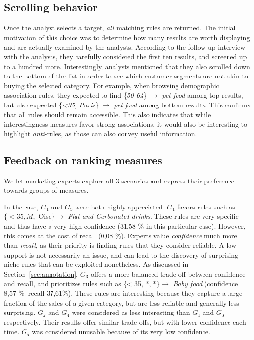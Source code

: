 \subsection{Scrolling behavior}
Once the analyst selects a target, \emph{all} matching rules are returned.
The initial motivation of this choice was to determine how many results
are worth displaying and are actually examined by the analysts.
According to the follow-up interview with the analysts, they carefully considered the first ten results,
and screened up to a hundred more.
Interestingly, analysts mentioned that
they also scrolled down to the bottom of the list
in order to see which customer segments are not akin to buying the selected category.
For example, when browsing demographic association rules,
they expected to find \{{\em 50-64}\} $\rightarrow$ {\em pet food} among top results,
but also expected \{{\em <35, Paris}\} $\rightarrow$ {\em pet food} among bottom results.
This confirms that all rules should remain accessible.
This also indicates that while interestingness measures favor strong associations,
it would also be interesting to highlight {\em anti}-rules, as those can also convey useful information.

\subsection{Feedback on ranking measures}
We let marketing experts explore all 3 scenarios and express their preference towards groups of measures.

In the \demoassoc case, $G_1$ and $G_3$ were both highly appreciated.
$G_1$ favors rules such as $\{< 35, M, $ Oise$\}\rightarrow$ {\em Flat and Carbonated drinks}.
These rules are very specific and thus have a very high confidence (31,58 \% in this particular case).
However, this comes at the cost of recall (0,08 \%).
Experts value {\em confidence} much more than {\em recall}, as their priority is finding rules that they consider reliable.
A low support is not necessarily an issue, and can lead to the discovery of surprising niche rules that can be exploited nonetheless.
As discussed in Section~\ref{sec:annotation},
$G_3$ offers a more balanced trade-off between confidence and recall,
and prioritizes rules such as $\{$< 35, *, *$\}\rightarrow$ {\em Baby food} (confidence 8,57 \%, recall 37,61\%).
These rules are interesting because they capture a large fraction of the sales of a given category, but are less reliable and generally less surprising.
$G_2$ and $G_4$ were considered as less interesting than $G_1$ and $G_3$ respectively.
Their results offer similar trade-offs, but with lower confidence each time.
$G_5$ was considered unusable because of its very low confidence.

